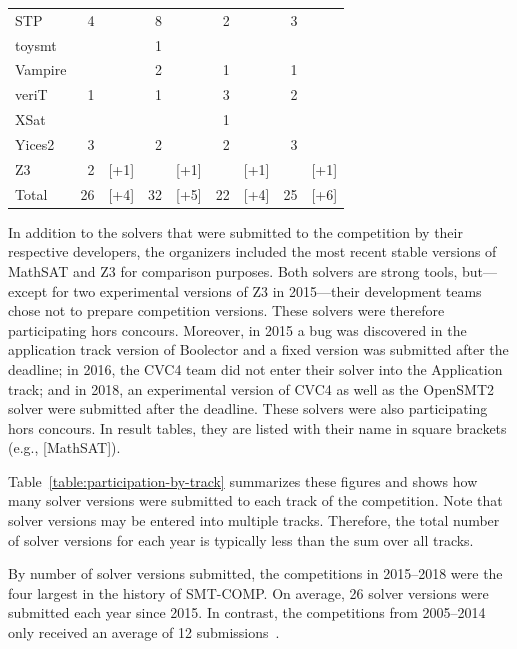\documentclass[dvipsnames,table,twoside,11pt]{article}
\begin{document}
\begin{table}
\begin{tabular}{lr@{\,\,}rr@{\,\,}rr@{\,\,}rr@{\,\,}r}
    STP               &  4 &      &  8 &      &  2 &      &  3 &      \\
    toysmt            &    &      &  1 &      &    &      &    &      \\
    Vampire           &    &      &  2 &      &  1 &      &  1 &      \\
    veriT             &  1 &      &  1 &      &  3 &      &  2 &      \\
    XSat              &    &      &    &      &  1 &      &    &      \\
    Yices2            &  3 &      &  2 &      &  2 &      &  3 &      \\
    Z3                &  2 & [+1] &    & [+1] &    & [+1] &    & [+1] \\
    \midrule
    Total             & 26 & [+4] & 32 & [+5] & 22 & [+4] & 25 & [+6] \\
    \bottomrule
  \end{tabular}
\end{table}

In addition to the solvers that were submitted to the competition by
their respective developers, the organizers included the most recent
stable versions of MathSAT and Z3 for comparison purposes.  Both
solvers are strong tools, but---except for two experimental versions
of Z3 in 2015---their development teams chose not to prepare
competition versions.  These solvers were therefore participating hors
concours.  Moreover, in 2015 a bug was discovered in the application
track version of Boolector and a fixed version was submitted after the
deadline; in 2016, the CVC4 team did not enter their solver into the
Application track; and in 2018, an experimental version of CVC4 as
well as the OpenSMT2 solver were submitted after the deadline.  These
solvers were also participating hors concours.  In result tables, they
are listed with their name in square brackets (e.g., [MathSAT]).

Table~\ref{table:participation-by-track} summarizes these figures and
shows how many solver versions were submitted to each track of the
competition.  Note that solver versions may be entered into multiple
tracks.  Therefore, the total number of solver versions for each year
is typically less than the sum over all tracks.

By number of solver versions submitted, the competitions in 2015--2018
were the four largest in the history of SMT-COMP.  On average, 26
solver versions were submitted each year since 2015.  In contrast, the
competitions from 2005--2014 only received an average of 12
submissions~\cite{CDW14}.
\end{document}
